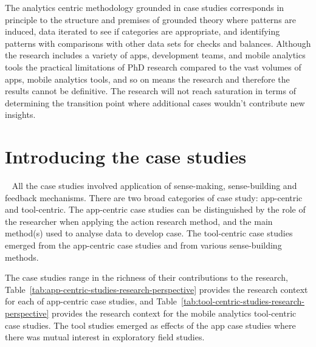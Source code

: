 The analytics centric methodology grounded in case studies corresponds in principle to the structure and premises of grounded theory where patterns are induced, data iterated to see if categories are appropriate, and identifying patterns with comparisons with other data sets for checks and balances. Although the research includes a variety of apps, development teams, and mobile analytics tools the practical limitations of PhD research compared to the vast volumes of apps, mobile analytics tools, and so on means the research and therefore the results cannot be definitive. The research will not reach saturation in terms of determining the transition point where additional cases wouldn't contribute new insights.

\clearpage

\section{Introducing the case studies}~\label{section-introducing-the-case-studies}
All the case studies involved application of sense-making, sense-building and feedback mechanisms. There are two broad categories of case study: app-centric and tool-centric. The app-centric case studies can be distinguished by the role of the researcher when applying the action research method, and the main method(s) used to analyse data to develop case.
The tool-centric case studies emerged from the app-centric case studies and from various sense-building methods.
 
The case studies range in the richness of their contributions to the research, Table~\ref{tab:app-centric-studies-research-perspective} provides the research context for each of app-centric case studies, and Table~\ref{tab:tool-centric-studies-research-perspective} provides the research context for the mobile analytics tool-centric case studies. The tool studies emerged as effects of the app case studies where there was mutual interest in exploratory field studies. 

